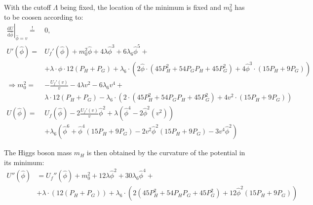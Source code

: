With the cutoff $\Lambda$ being fixed, the location of the minimum is fixed and $m_0^2$ has to be coosen according to:
\begin{align}
 \left. \frac{\text{d} U}{\text{d}\hat \phi} \right|_{\hat \phi = v} \stackrel{!}{=}& 0, \\
 U'(\hat \phi)=&  U_f'(\hat \phi) + m_0^2 {\hat \phi} + 4 \lambda {\hat \phi}^3 + 6 \lambda_6 {\hat \phi}^5 + \nonumber \\
            & + \lambda \cdot {\hat \phi} \cdot 12 (P_H + P_G) 
              + \lambda_6 \cdot \left( 2 {\hat \phi} \cdot ( 45 P_H^2 + 54 P_G P_H + 45 P_G^2)
                         + 4{\hat \phi}^3 \cdot ( 15 P_H + 9 P_G ) \right ) \\
%  
 \Rightarrow m_0^2 =& -\frac{U_f'(v)}{v} - 4 \lambda {v}^2 - 6 \lambda_6 {v}^4 + \nonumber \\
                    & \lambda \cdot 12 (P_H + P_G)
                       -\lambda_6 \cdot \left( 2 \cdot ( 45 P_H^2 + 54 P_G P_H + 45 P_G^2)
                         + 4 v^2 \cdot ( 15 P_H + 9 P_G ) \right ) \\
%                          
 U(\hat \phi) =& U_f(\hat \phi) - 2\frac{U_f'(v)}{v} {\hat \phi}^2
                 + \lambda \left( {\hat \phi}^4 - 2 {\hat \phi}^2( v^2)  \right) \nonumber \\
               & + \lambda_6 \left( {\hat \phi}^6 + {\hat \phi}^4 ( 15 P_H + 9 P_G ) 
                 - 2 v^2 {\hat \phi}^2 ( 15 P_H + 9 P_G ) - 3 v^4 {\hat \phi}^2 \right)                 
\end{align}

The Higgs boson mass $m_H$ is then obtained by the curvature of the potential in its minimum:
\begin{align}
 U''({\hat\phi}) &= U_f''({\hat\phi}) + m_0^2 + 12 \lambda {\hat\phi}^2 + 30 \lambda_6 {\hat\phi}^4 + \nonumber \\
                 & + \lambda \cdot  \left( 12 (P_H + P_G) \right)
                   + \lambda_6 \cdot \left( 2 (45 P_H^2 + 54 P_H P_G + 45 P_G^2) + 12 {\hat\phi}^2 (15 P_H + 9 P_G) \right)
\end{align}



